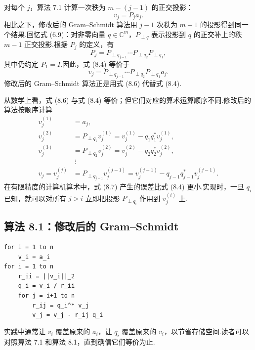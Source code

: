 \documentclass[UTF8,fontset=none,12pt]{ctexart}
\newcommand{\C}{\mathbb{C}}
\theoremstyle{definition}
\begin{document}
对每个 $j$，算法 7.1 计算一次秩为 $m-(j-1)$ 的正交投影：
\begin{equation}
    v_j=P_ja_j.
    \tag{8.4}
\end{equation}
相比之下，修改后的 Gram--Schmidt 算法用 $j-1$ 次秩为 $m-1$ 的投影得到同一个结果.回忆式 (6.9)：对非零向量 $q\in\C^m$，$P_{\perp q}$ 表示投影到 $q$ 的正交补上的秩 $m-1$ 正交投影.根据 $P_j$ 的定义，有
\begin{equation}
    P_j=P_{\perp q_{j-1}}\cdots P_{\perp q_2}P_{\perp q_1},
    \tag{8.5}
\end{equation}
其中仍约定 $P_1=I$.因此，式 (8.4) 等价于
\begin{equation}
    v_j=P_{\perp q_{j-1}}\cdots P_{\perp q_2}P_{\perp q_1}a_j.
    \tag{8.6}
\end{equation}
修改后的 Gram--Schmidt 算法正是用式 (8.6) 代替式 (8.4).

从数学上看，式 (8.6) 与式 (8.4) 等价；但它们对应的算术运算顺序不同.修改后的算法按顺序计算
\begin{equation}
\begin{aligned}
    v_j^{(1)}&=a_j,\\
    v_j^{(2)}&=P_{\perp q_1}v_j^{(1)}
        =v_j^{(1)}-q_1q_1^*v_j^{(1)},\\
    v_j^{(3)}&=P_{\perp q_2}v_j^{(2)}
        =v_j^{(2)}-q_2q_2^*v_j^{(2)},\\
    &\ \vdots\\
    v_j=v_j^{(j)}&=P_{\perp q_{j-1}}v_j^{(j-1)}
        =v_j^{(j-1)}-q_{j-1}q_{j-1}^*v_j^{(j-1)}.
\end{aligned}
\tag{8.7}
\end{equation}
在有限精度的计算机算术中，式 (8.7) 产生的误差比式 (8.4) 更小.实现时，一旦 $q_i$ 已知，就可以对所有 $j>i$ 立即把投影 $P_{\perp q_i}$ 作用到 $v_j^{(i)}$ 上.

\subsection*{算法 8.1：修改后的 Gram--Schmidt}

\begin{verbatim}
for i = 1 to n
    v_i = a_i
for i = 1 to n
    r_ii = ||v_i||_2
    q_i = v_i / r_ii
    for j = i+1 to n
        r_ij = q_i^* v_j
        v_j = v_j - r_ij q_i
\end{verbatim}

实践中通常让 $v_i$ 覆盖原来的 $a_i$，让 $q_i$ 覆盖原来的 $v_i$，以节省存储空间.读者可以对照算法 7.1 和算法 8.1，直到确信它们等价为止.
\end{document}
